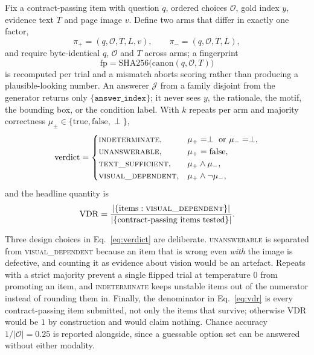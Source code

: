 \documentclass[conference]{IEEEtran}
\newcommand{\vdrate}{\mathrm{VDR}}
\begin{document}
Fix a contract-passing item with question $q$, ordered choices $\mathcal{O}$, gold
index $y$, evidence text $T$ and page image $v$. Define two arms that differ in
exactly one factor,
\begin{equation}
\pi_{+}=(q,\mathcal{O},T,L,v),\qquad \pi_{-}=(q,\mathcal{O},T,L),
\end{equation}
and require byte-identical $q$, $\mathcal{O}$ and $T$ across arms; a fingerprint
\begin{equation}
\mathrm{fp}=\mathrm{SHA256}\bigl(\mathrm{canon}(q,\mathcal{O},T)\bigr)
\end{equation}
is recomputed per trial and a mismatch aborts scoring rather than producing a
plausible-looking number. An answerer $\mathcal{J}$ from a family disjoint from the
generator returns only $\{\texttt{answer\_index}\}$; it never sees $y$, the
rationale, the motif, the bounding box, or the condition label. With $k$ repeats
per arm and majority correctness $\mu_{\pm}\in\{\text{true},\text{false},\perp\}$,
\begin{equation}
\mathrm{verdict}=
\begin{cases}
\textsc{indeterminate}, & \mu_{+}=\perp \text{ or } \mu_{-}=\perp,\\
\textsc{unanswerable}, & \mu_{+}=\text{false},\\
\textsc{text\_sufficient}, & \mu_{+}\wedge\mu_{-},\\
\textsc{visual\_dependent}, & \mu_{+}\wedge\neg\mu_{-},
\end{cases}
\label{eq:verdict}
\end{equation}
and the headline quantity is
\begin{equation}
\vdrate=\frac{|\{\text{items}:\textsc{visual\_dependent}\}|}{|\{\text{contract-passing items tested}\}|}.
\label{eq:vdr}
\end{equation}

Three design choices in Eq.~\eqref{eq:verdict} are deliberate. \textsc{unanswerable}
is separated from \textsc{visual\_dependent} because an item that is wrong even
\emph{with} the image is defective, and counting it as evidence about vision would
be an artefact. Repeats with a strict majority prevent a single flipped trial at
temperature $0$ from promoting an item, and \textsc{indeterminate} keeps unstable
items out of the numerator instead of rounding them in. Finally, the denominator in
Eq.~\eqref{eq:vdr} is every contract-passing item submitted, not only the items that
survive; otherwise $\vdrate$ would be $1$ by construction and would claim nothing.
Chance accuracy $1/|\mathcal{O}|=0.25$ is reported alongside, since a guessable
option set can be answered without either modality.
\end{document}
